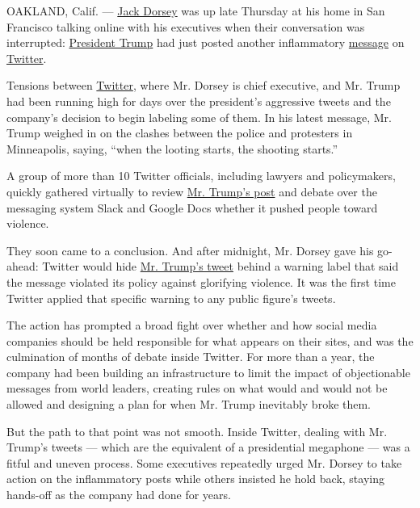 OAKLAND, Calif. ---
\href{https://www.nytimes3xbfgragh.onion/2020/06/23/technology/trump-twitter-label-seattle.html}{Jack
Dorsey} was up late Thursday at his home in San Francisco talking online
with his executives when their conversation was interrupted:
\href{https://www.nytimes3xbfgragh.onion/2020/06/23/technology/trump-twitter-label-seattle.html}{President
Trump} had just posted another inflammatory
\href{https://twitter.com/realDonaldTrump/status/1266231100780744704}{message}
on
\href{https://www.nytimes3xbfgragh.onion/2020/06/09/us/politics/trump-twitter.html}{Twitter}.

Tensions between
\href{https://www.nytimes3xbfgragh.onion/2020/06/10/technology/trump-twitter-protests.html}{Twitter},
where Mr. Dorsey is chief executive, and Mr. Trump had been running high
for days over the president's aggressive tweets and the company's
decision to begin labeling some of them. In his latest message, Mr.
Trump weighed in on the clashes between the police and protesters in
Minneapolis, saying, ``when the looting starts, the shooting starts.''

A group of more than 10 Twitter officials, including lawyers and
policymakers, quickly gathered virtually to review
\href{https://www.nytimes3xbfgragh.onion/2020/06/03/us/politics/trump-twitter-fact-check.html}{Mr.
Trump's post} and debate over the messaging system Slack and Google Docs
whether it pushed people toward violence.

They soon came to a conclusion. And after midnight, Mr. Dorsey gave his
go-ahead: Twitter would hide
\href{https://www.nytimes3xbfgragh.onion/2020/06/03/us/politics/trump-twitter-fact-check.html}{Mr.
Trump's tweet} behind a warning label that said the message violated its
policy against glorifying violence. It was the first time Twitter
applied that specific warning to any public figure's tweets.

The action has prompted a broad fight over whether and how social media
companies should be held responsible for what appears on their sites,
and was the culmination of months of debate inside Twitter. For more
than a year, the company had been building an infrastructure to limit
the impact of objectionable messages from world leaders, creating rules
on what would and would not be allowed and designing a plan for when Mr.
Trump inevitably broke them.

But the path to that point was not smooth. Inside Twitter, dealing with
Mr. Trump's tweets --- which are the equivalent of a presidential
megaphone --- was a fitful and uneven process. Some executives
repeatedly urged Mr. Dorsey to take action on the inflammatory posts
while others insisted he hold back, staying hands-off as the company had
done for years.

